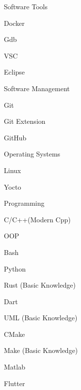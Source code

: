 


\newpage
{}

\begin{cvskills}

  \cvskill
    {\normalsize Software Tools} %
        {
            
            \item Docker
            \item Gdb
            \item VSC
            \item Eclipse
        }
  \cvskill
    {\normalsize Software Management} %
        {
            \item Git
            \item Git Extension
            \item GitHub
        }
  \cvskill
    {\normalsize Operating Systems} %
        {
            \item Linux
            \item Yocto
        }
  \cvskill
    {\normalsize Programming} %
        {
            \item C/C++(Modern Cpp)
            \item OOP
            \item Bash
            \item Python
            \item Rust (Basic Knowledge)
            \item Dart
            \item UML  (Basic Knowledge)
            \item CMake 
            \item Make (Basic Knowledge)
            \item Matlab
            \item Flutter
        }


\end{cvskills}
